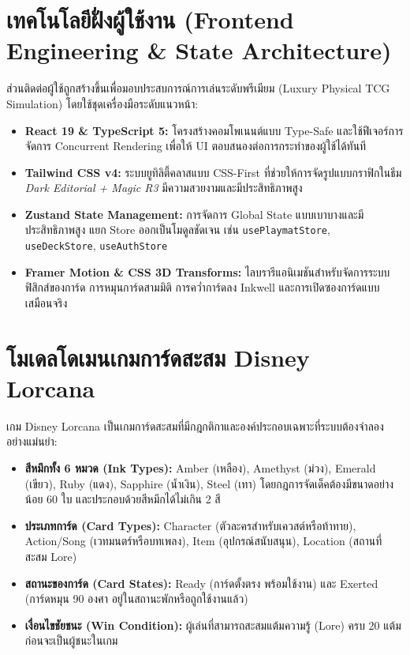 \documentclass[12pt,a4paper]{report}
\begin{document}
\section{เทคโนโลยีฝั่งผู้ใช้งาน (Frontend Engineering \& State Architecture)}
ส่วนติดต่อผู้ใช้ถูกสร้างขึ้นเพื่อมอบประสบการณ์การเล่นระดับพรีเมียม (Luxury Physical TCG Simulation) โดยใช้ชุดเครื่องมือระดับแนวหน้า:
\begin{itemize}
    \item \textbf{React 19 \& TypeScript 5:} โครงสร้างคอมโพเนนต์แบบ Type-Safe และใช้ฟีเจอร์การจัดการ Concurrent Rendering เพื่อให้ UI ตอบสนองต่อการกระทำของผู้ใช้ได้ทันที
    \item \textbf{Tailwind CSS v4:} ระบบยูทิลิตี้คลาสแบบ CSS-First ที่ช่วยให้การจัดรูปแบบกราฟิกในธีม \textit{Dark Editorial + Magic R3} มีความสวยงามและมีประสิทธิภาพสูง
    \item \textbf{Zustand State Management:} การจัดการ Global State แบบเบาบางและมีประสิทธิภาพสูง แยก Store ออกเป็นโมดูลชัดเจน เช่น \texttt{usePlaymatStore}, \texttt{useDeckStore}, \texttt{useAuthStore}
    \item \textbf{Framer Motion \& CSS 3D Transforms:} ไลบรารีแอนิเมชันสำหรับจัดการระบบฟิสิกส์ของการ์ด การหมุนการ์ดสามมิติ การคว่ำการ์ดลง Inkwell และการเปิดซองการ์ดแบบเสมือนจริง
\end{itemize}

\section{โมเดลโดเมนเกมการ์ดสะสม Disney Lorcana}
เกม Disney Lorcana เป็นเกมการ์ดสะสมที่มีกฎกติกาและองค์ประกอบเฉพาะที่ระบบต้องจำลองอย่างแม่นยำ:
\begin{itemize}
    \item \textbf{สีหมึกทั้ง 6 หมวด (Ink Types):} Amber (เหลือง), Amethyst (ม่วง), Emerald (เขียว), Ruby (แดง), Sapphire (น้ำเงิน), Steel (เทา) โดยกฎการจัดเด็คต้องมีขนาดอย่างน้อย 60 ใบ และประกอบด้วยสีหมึกได้ไม่เกิน 2 สี
    \item \textbf{ประเภทการ์ด (Card Types):} Character (ตัวละครสำหรับเควสต์หรือท้าทาย), Action/Song (เวทมนตร์หรือบทเพลง), Item (อุปกรณ์สนับสนุน), Location (สถานที่สะสม Lore)
    \item \textbf{สถานะของการ์ด (Card States):} Ready (การ์ดตั้งตรง พร้อมใช้งาน) และ Exerted (การ์ดหมุน 90 องศา อยู่ในสถานะพักหรือถูกใช้งานแล้ว)
    \item \textbf{เงื่อนไขชัยชนะ (Win Condition):} ผู้เล่นที่สามารถสะสมแต้มความรู้ (Lore) ครบ 20 แต้มก่อนจะเป็นผู้ชนะในเกม
\end{itemize}
\end{document}
